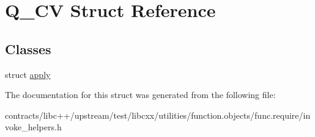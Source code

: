 \hypertarget{struct_q___c_v}{}\section{Q\+\_\+\+CV Struct Reference}
\label{struct_q___c_v}
\subsection*{Classes}
\begin{DoxyCompactItemize}
\item 
struct \mbox{\hyperlink{struct_q___c_v_1_1apply}{apply}}
\end{DoxyCompactItemize}


The documentation for this struct was generated from the following file\+:\begin{DoxyCompactItemize}
\item 
contracts/libc++/upstream/test/libcxx/utilities/function.\+objects/func.\+require/invoke\+\_\+helpers.\+h\end{DoxyCompactItemize}
